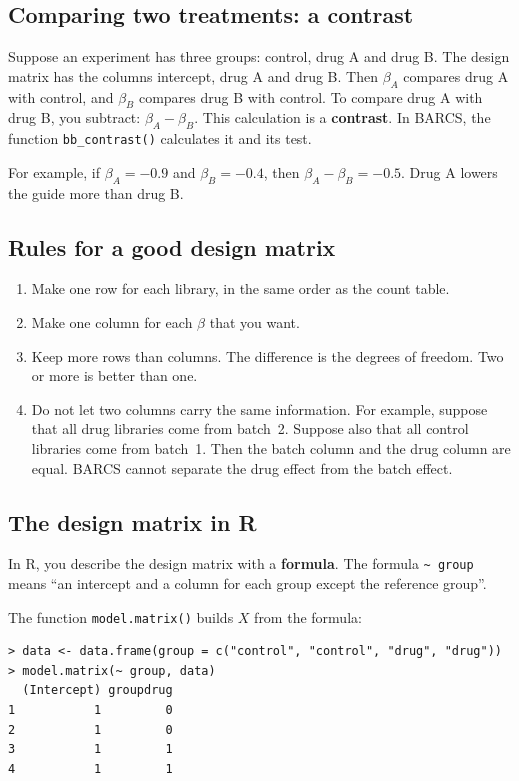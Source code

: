 \subsection{Comparing two treatments: a contrast}

Suppose an experiment has three groups: control, drug A and drug B. The
design matrix has the columns intercept, drug A and drug B. Then $\beta_A$
compares drug A with control, and $\beta_B$ compares drug B with control. To
compare drug A with drug B, you subtract: $\beta_A - \beta_B$. This
calculation is a \textbf{contrast}. In BARCS, the function
\texttt{bb\_contrast()} calculates it and its test.

For example, if $\beta_A = -0.9$ and $\beta_B = -0.4$, then
$\beta_A - \beta_B = -0.5$. Drug A lowers the guide more than drug B.

\subsection{Rules for a good design matrix}

\begin{enumerate}
\item Make one row for each library, in the same order as the count table.
\item Make one column for each $\beta$ that you want.
\item Keep more rows than columns. The difference is the degrees of
  freedom. Two or more is better than one.
\item Do not let two columns carry the same information. For example,
  suppose that all drug libraries come from batch~2. Suppose also that all
  control libraries come from batch~1. Then the batch column and the drug
  column are equal. BARCS cannot separate the drug effect from the batch
  effect.
\end{enumerate}

\subsection{The design matrix in R}

In R, you describe the design matrix with a \textbf{formula}. The formula
\texttt{\textasciitilde\ group} means ``an intercept and a column for each
group except the reference group''.

The function \texttt{model.matrix()} builds $X$ from the formula:

\begin{center}
\begin{minipage}{0.86\textwidth}
\small
\begin{verbatim}
> data <- data.frame(group = c("control", "control", "drug", "drug"))
> model.matrix(~ group, data)
  (Intercept) groupdrug
1           1         0
2           1         0
3           1         1
4           1         1
\end{verbatim}
\end{minipage}
\end{center}

